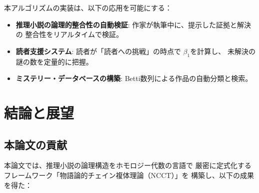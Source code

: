 \documentclass[12pt,twocolumn]{ltjsarticle}
\begin{document}
本アルゴリズムの実装は、以下の応用を可能にする：

\begin{itemize}
\item \textbf{推理小説の論理的整合性の自動検証}:
作家が執筆中に、提示した証拠と解決の
整合性をリアルタイムで検証。

\item \textbf{読者支援システム}:
読者が「読者への挑戦」の時点で
$\beta_1$を計算し、
未解決の謎の数を定量的に把握。

\item \textbf{ミステリー・データベースの構築}:
Betti数列による作品の自動分類と検索。
\end{itemize}


\section{結論と展望}
\label{sec:conclusion}

\subsection{本論文の貢献}

本論文では、推理小説の論理構造をホモロジー代数の言語で
厳密に定式化するフレームワーク「物語論的チェイン複体理論（NCCT）」を
構築し、以下の成果を得た：
\end{document}
